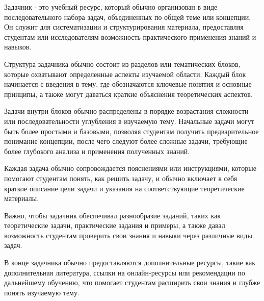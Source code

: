 Задачник - это учебный ресурс, который обычно организован в виде последовательного набора задач, объединенных по общей теме или концепции. Он служит для систематизации и структурирования материала, предоставляя студентам или исследователям возможность практического применения знаний и навыков.

Структура задачника обычно состоит из разделов или тематических блоков, которые охватывают определенные аспекты изучаемой области. Каждый блок начинается с введения в тему, где обозначаются ключевые понятия и основные принципы, а также могут даваться краткие объяснения теоретических аспектов.

Задачи внутри блоков обычно распределены в порядке возрастания сложности или последовательности углубления в изучаемую тему. Начальные задачи могут быть более простыми и базовыми, позволяя студентам получить предварительное понимание концепции, после чего следуют более сложные задачи, требующие более глубокого анализа и применения полученных знаний.

Каждая задача обычно сопровождается пояснениями или инструкциями, которые помогают студентам понять, как решить задачу, и обычно включает в себя краткое описание цели задачи и указания на соответствующие теоретические материалы.

Важно, чтобы задачник обеспечивал разнообразие заданий, таких как теоретические задачи, практические задания и примеры, а также давал возможность студентам проверить свои знания и навыки через различные виды задач.

В конце задачника обычно предоставляются дополнительные ресурсы, такие как дополнительная литература, ссылки на онлайн-ресурсы или рекомендации по дальнейшему обучению, что помогает студентам расширить свои знания и глубже понять изучаемую тему.


